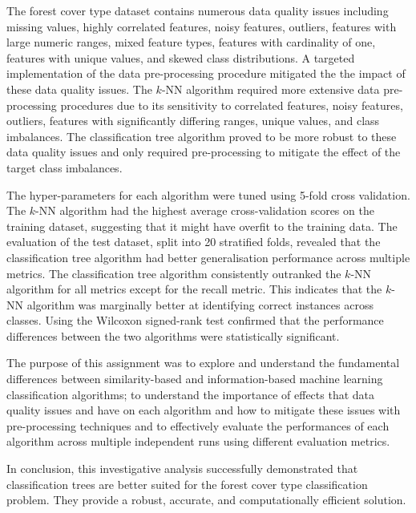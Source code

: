 \documentclass[conference]{IEEEtran}
\begin{document}
	The forest cover type dataset contains numerous data quality issues including missing values, highly correlated features, noisy features, outliers, features with large numeric ranges, mixed feature types, features with cardinality of one, features with unique values, and skewed class distributions. A targeted implementation of the data pre-processing procedure mitigated the the impact of these data quality issues. The $k$-NN algorithm required more extensive data pre-processing procedures due to its sensitivity to correlated features, noisy features, outliers, features with significantly differing ranges, unique values, and class imbalances. The classification tree algorithm proved to be more robust to these data quality issues and only required pre-processing to mitigate the effect of the target class imbalances. 
	
	The hyper-parameters for each algorithm were tuned using 5-fold cross validation. The $k$-NN algorithm had the highest average cross-validation scores on the training dataset, suggesting that it might have overfit to the training data. The evaluation of the test dataset, split into 20 stratified folds, revealed that the classification tree algorithm had better generalisation performance across multiple metrics. The classification tree algorithm consistently outranked the $k$-NN algorithm for all metrics except for the recall metric. This indicates that the $k$-NN algorithm was marginally better at identifying correct instances across classes. Using the Wilcoxon signed-rank test confirmed that the performance differences between the two algorithms were statistically significant. 
	
	The purpose of this assignment was to explore and understand the fundamental differences between similarity-based and information-based machine learning classification algorithms; to understand the importance of effects that data quality issues and have on each algorithm and how to mitigate these issues with pre-processing techniques and to effectively evaluate the performances of each algorithm across multiple independent runs using different evaluation metrics.
	
	In conclusion, this investigative analysis successfully demonstrated that classification trees are better suited for the forest cover type classification problem. They provide a robust, accurate, and computationally efficient solution.
	
\end{document}
